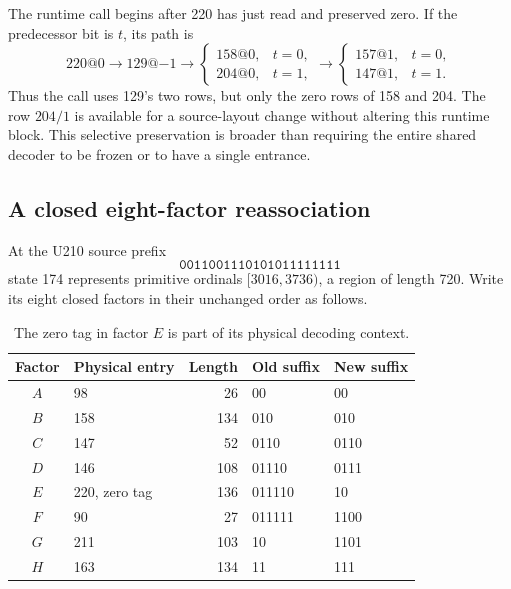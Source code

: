 The runtime call begins after 220 has just read and preserved zero.
If the predecessor bit is \(t\), its path is
\[
 220@0\to129@{-1}
 \to\begin{cases}158@0,&t=0,\\204@0,&t=1,\end{cases}
 \to\begin{cases}157@1,&t=0,\\147@1,&t=1.\end{cases}
 \tag{3}
\]
Thus the call uses 129's two rows, but only the zero rows of 158 and 204.
The row \(204/1\) is available for a source-layout change without altering
this runtime block. This selective preservation is broader than requiring
the entire shared decoder to be frozen or to have a single entrance.

\subsection{A closed eight-factor reassociation}
At the U210 source prefix
\[
 \texttt{0011001110101011111111}
\]
state 174 represents primitive ordinals \([3016,3736)\), a region of length 720.
Write its eight closed factors in their unchanged order as follows.

\begin{table}[ht]
\centering\small
\begin{tabular}{cl r ll}
\toprule
Factor & Physical entry & Length & Old suffix & New suffix\\
\midrule
\(A\)&98&26&00&00\\
\(B\)&158&134&010&010\\
\(C\)&147&52&0110&0110\\
\(D\)&146&108&01110&0111\\
\(E\)&220, zero tag&136&011110&10\\
\(F\)&90&27&011111&1100\\
\(G\)&211&103&10&1101\\
\(H\)&163&134&11&111\\
\bottomrule
\end{tabular}
\caption{The zero tag in factor \(E\) is part of its physical decoding context.}
\end{table}

